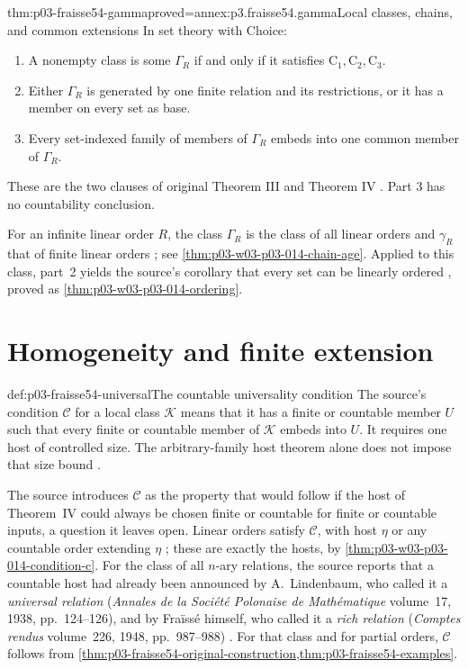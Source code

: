 \begin{hbtheorem}{thm:p03-fraisse54-gamma}{proved=annex:p3.fraisse54.gamma}{Local classes, chains, and common extensions}
In set theory with Choice:
\begin{enumerate}
\item A nonempty class is some \(\Gamma_R\) if and only if it satisfies
      \(\mathrm C_1,\mathrm C_2,\mathrm C_3\).
\item Either \(\Gamma_R\) is generated by one finite relation and its
      restrictions, or it has a member on every set as base.
\item Every set-indexed family of members of \(\Gamma_R\) embeds into
      one common member of \(\Gamma_R\).
\end{enumerate}
These are the two clauses of original Theorem III and Theorem IV
\cite[\S4]{Fraisse1954}. Part 3 has no countability conclusion.
\end{hbtheorem}

For an infinite linear order \(R\), the class \(\Gamma_R\) is the class of
all linear orders and \(\gamma_R\) that of finite linear orders
\cite[\S1.4, p.~365]{Fraisse1954}; see
\cref{thm:p03-w03-p03-014-chain-age}. Applied to this class, part~2
yields the source's corollary that every set can be linearly ordered
\cite[\S4.1, p.~374]{Fraisse1954}, proved as
\cref{thm:p03-w03-p03-014-ordering}.

\section{Homogeneity and finite extension}
\label{sec:p03-fraisse54-homogeneity}
\begin{hbdefinition}{def:p03-fraisse54-universal}{The countable universality condition}
The source's condition \(\mathcal C\) for a local class \(\mathcal K\)
means that it has a finite or countable member \(U\) such that every finite
or countable member of \(\mathcal K\) embeds into \(U\).
It requires one host of controlled size. The arbitrary-family host theorem
alone does not impose that size bound \cite[\S4.7]{Fraisse1954}.
\end{hbdefinition}

The source introduces \(\mathcal C\) as the property that would follow if
the host of Theorem~IV could always be chosen finite or countable for
finite or countable inputs, a question it leaves open. Linear orders
satisfy \(\mathcal C\), with host \(\eta\) or any countable order extending
\(\eta\) \cite[\S4.7, p.~376]{Fraisse1954}; these are exactly the hosts,
by \cref{thm:p03-w03-p03-014-condition-c}. For the class of all
\(n\)-ary relations, the source reports that a countable host had already
been announced by A.~Lindenbaum, who called it a \emph{universal relation}
(\emph{Annales de la Soci\'et\'e Polonaise de Math\'ematique} volume~17,
1938, pp.~124--126), and by Fra\"iss\'e himself, who called it a
\emph{rich relation} (\emph{Comptes rendus} volume~226, 1948,
pp.~987--988) \cite[\S4.7 and nn.~7--8, pp.~376--377]{Fraisse1954}.
For that class and for partial orders, \(\mathcal C\) follows from
\cref{thm:p03-fraisse54-original-construction,thm:p03-fraisse54-examples}.

